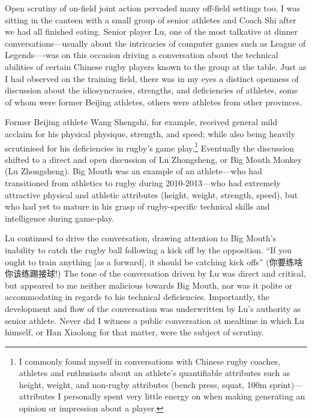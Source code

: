 \begin{CJK}{UTF8}{gbsn}
Open scrutiny of on-field joint action pervaded many off-field settings too.  I was sitting in the canteen with a small group of senior athletes and Coach Shi after we had all finished eating.  Senior player Lu, one of the most talkative at dinner conversations---usually about the intricacies of computer games such as League of Legends----was on this occasion driving a conversation about the technical abilities of certain Chinese rugby players known to the group at the table.  Just as I had observed on the training field, there was in my eyes a distinct openness of discussion about the idiosyncrasies, strengths, and deficiencies of athletes, some of whom were former Beijing athletes, others were athletes from other provinces.

Former Beijing athlete Wang Shengshi, for example, received general mild acclaim for his physical physique, strength, and speed; while also being heavily scrutinised for his deficiencies in rugby's game play.\footnote{I commonly found myself in conversations with Chinese rugby coaches, athletes and enthusiasts about an athlete's quantifiable attributes such as height, weight, and non-rugby attributes (bench press, squat, 100m sprint)---attributes I personally spent very little energy on when making generating an opinion or impression about a player.}  Eventually the discussion shifted to a direct and open discussion of Lu Zhongsheng, or Big Mouth Monkey (Lu Zhongsheng).  Big Mouth was an example of an athlete---who had transitioned from athletics to rugby during 2010-2013---who had extremely attractive physical and athletic attributes (height, weight, strength, speed), but who had yet to mature in his grasp of rugby-specific technical skills and intelligence during game-play.

Lu continued to drive the conversation, drawing attention to Big Mouth's inability to catch the rugby ball following a kick off by the opposition. ``If you ought to train anything [as a forward], it should be catching kick offs'' (你要练啥你该练踢接球!)  The tone of the conversation driven by Lu was direct and critical, but appeared to me neither malicious towards Big Mouth, nor was it polite or accommodating in regards to his technical deficiencies.  Importantly, the development and flow of the conversation was underwritten by Lu's authority as senior athlete.  Never did I witness a public conversation at mealtime in which Lu himself, or Han Xiaolong for that matter, were the subject of scrutiny.


\end{CJK}
